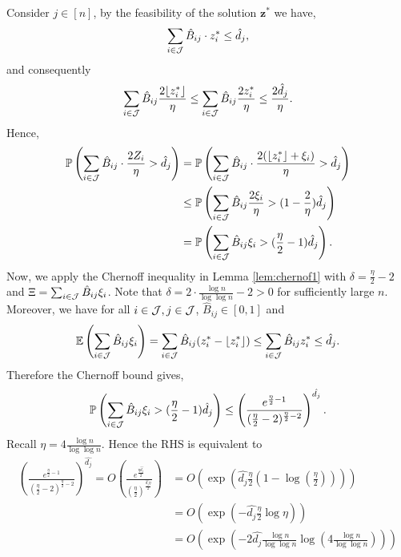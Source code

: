 \documentclass[moor]{informs1}              %
\newcommand{\mb}[1]{\ensuremath{\boldsymbol{#1}}}
\begin{document}
\begin{APPENDICES}
Consider $ j \in [n]$, by the feasibility of the solution $ \mb{z^*}$ we have,
$$ \sum_{i \in {\cal J}} \hat{B}_{ij} \cdot z_i^* \leq\hat{d}_j ,$$
and consequently
$$\sum_{i \in {\cal J}} \hat{B}_{ij} \frac{2 \lfloor{z_i^*}\rfloor}{\eta}  \leq \sum_{i \in {\cal J}} \hat{B}_{ij} \frac{2 z_i^*}{\eta} \leq   \frac{ 2\hat{ d}_j}{\eta} . $$
Hence,
\begin{align*}
\mathbb{P} \left(  \sum_{i \in {\cal J}} \hat{B}_{ij}  \cdot \frac{ 2Z_i}{\eta}      > \hat{d}_j  \right) &=\mathbb{P} \left(  \sum_{i \in {\cal J}} \hat{B}_{ij} \cdot \frac{ 2 ( \lfloor{z_i^*}\rfloor+ {\xi}_i)}{\eta}     >  \hat{d}_j  \right)  \\
&\leq \mathbb{P} \left(  \sum_{i \in {\cal J}} \hat{B}_{ij} \frac{2 {\xi}_i}{\eta}     > (1- \frac{2}{\eta}) \hat{d}_j  \right)  \\
&=\mathbb{P} \left(  \sum_{i \in {\cal J}} \hat{B}_{ij}  {\xi}_i    > (\frac{\eta}{2}- 1) \hat{d}_j  \right).
\end{align*}
Now, we apply the Chernoff inequality in Lemma \ref{lem:chernof1} with $\delta =\frac{\eta}{2} -2$ and $\Xi=  \sum_{i \in {\cal J}} \hat{B}_{ij}  {\xi}_i$. Note that 
$ \delta = 2 \cdot \frac{\log n }{\log \log n}-2 >0$ for sufficiently large $n$.  Moreover, we have for all $ i \in {\cal J}, j \in {\cal J}$, $\hat{B}_{ij} \in [0,1]$ and
$$\mathbb{E} \left( \sum_{i \in {\cal J}} \hat{B}_{ij} {\xi}_i \right)  =  \sum_{i \in {\cal J}} \hat{B}_{ij} (z_i^*- \lfloor{z_i^*}\rfloor) \leq \sum_{i \in {\cal J}} \hat{B}_{ij} z_i^*  \leq \hat{d}_j.$$
Therefore the Chernoff bound gives,
$$
\mathbb{P} \left(  \sum_{i \in {\cal J}} \hat{B}_{ij}  {\xi}_i    > (\frac{\eta}{2}- 1) \hat{d}_j  \right)  \leq  \left( \frac{e^{\frac{\eta}{2} -1}}{ (\frac{\eta}{2}-2)^{\frac{\eta}{2} -2}} \right)^{\hat{d_j}}.$$
Recall $ \eta = 4 \frac{\log n}{\log \log n}$. Hence the RHS is equivalent to 
\begin{align*}
\left( \frac{e^{\frac{\eta}{2} -1}}{ (\frac{\eta}{2}-2)^{\frac{\eta}{2} -2}} \right)^{\hat{d_j}} = O \left( \frac{e^{\frac{\eta \hat{d_j}}{2}}}{ (\frac{\eta}{2})^{\frac{\hat{d_j} \eta}{2} }} \right) & = 
O  \left( \exp \left( \hat{d_j}\frac{\eta }{2} \left( 1 -  \log (\frac{\eta}{2}) \right) \right) \right) \\ 
 & = O  \left( \exp \left( -\hat{d_j}\frac{\eta}{2}  \log \eta \right) \right) \\
  & = O  \left( \exp \left( -2\hat{d_j} \frac{\log n}{\log \log n}  \log \left(4 \frac{\log n}{\log \log n} \right) \right) \right) \\

\end{align*}
\end{APPENDICES}
\end{document}
